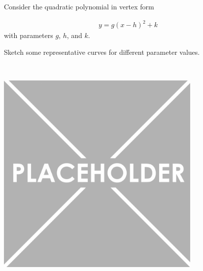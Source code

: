 Consider the quadratic polynomial in vertex form

\begin{align*}
    y = g(x - h)^2 + k
\end{align*}
with parameters $g$, $h$, and $k$.

Sketch some representative curves for different parameter values.

\begin{solution}\ \\
\begin{center}
    \includegraphics[width=0.75\textwidth]{img/placeholder.png}
\end{center}
\end{solution}